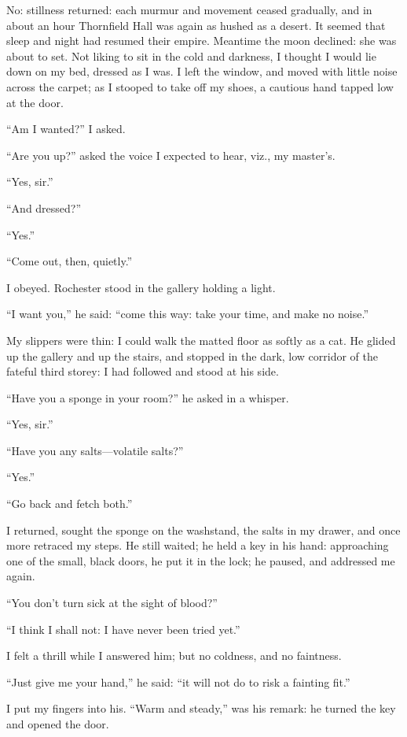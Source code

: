 No: stillness returned: each murmur and movement ceased gradually, and
in about an hour Thornfield Hall was again as hushed as a desert. It
seemed that sleep and night had resumed their empire. Meantime the moon
declined: she was about to set. Not liking to sit in the cold and
darkness, I thought I would lie down on my bed, dressed as I was. I
left the window, and moved with little noise across the carpet; as I
stooped to take off my shoes, a cautious hand tapped low at the door.

\enquote{Am I wanted?} I asked.

\enquote{Are you up?} asked the voice I expected to hear, viz., my
master's.

\enquote{Yes, sir.}

\enquote{And dressed?}

\enquote{Yes.}

\enquote{Come out, then, quietly.}

I obeyed. \Mr{} Rochester stood in the gallery holding a light.

\enquote{I want you,} he said: \enquote{come this way: take your time,
and make no noise.}

My slippers were thin: I could walk the matted floor as softly as a
cat. He glided up the gallery and up the stairs, and stopped in the
dark, low corridor of the fateful third storey: I had followed and stood
at his side.

\enquote{Have you a sponge in your room?} he asked in a whisper.

\enquote{Yes, sir.}

\enquote{Have you any salts---volatile salts?}

\enquote{Yes.}

\enquote{Go back and fetch both.}

I returned, sought the sponge on the washstand, the salts in my drawer,
and once more retraced my steps. He still waited; he held a key in his
hand: approaching one of the small, black doors, he put it in the lock;
he paused, and addressed me again.

\enquote{You don't turn sick at the sight of blood?}

\enquote{I think I shall not: I have never been tried yet.}

I felt a thrill while I answered him; but no coldness, and no faintness.

\enquote{Just give me your hand,} he said: \enquote{it will not do to
risk a fainting fit.}

I put my fingers into his. \enquote{Warm and steady,} was his remark:
he turned the key and opened the door.

